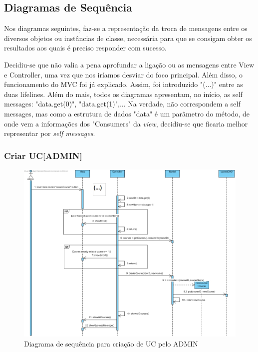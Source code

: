 \documentclass[a4paper]{article}
\begin{document}
\clearpage
\subsection{Diagramas de Sequência}

Nos diagramas seguintes, faz-se a representação da troca de mensagens entre os diversos objetos ou instâncias de classe, necessária para que se consigam obter os resultados aos quais é preciso responder com sucesso.

Decidiu-se que não valia a pena aprofundar a ligação ou as mensagens entre View e Controller, uma vez que nos iríamos desviar do foco principal. Além disso, o funcionamento do MVC foi já explicado. Assim, foi introduzido "(...)" entre as duas lifelines.
Além do mais, todos os diagramas apresentam, no início, as self messages: "data.get(0)", "data.get(1)",... 
Na verdade, não correspondem a self messages, mas como a estrutura de dados "data" é um parâmetro do método, de onde vem a informações dos "Consumers" da \emph{view}, decidiu-se que ficaria melhor representar por \emph{self messages}.


\subsubsection{Criar UC[ADMIN]}

\begin{figure}[H]
\centering
\includegraphics[width=14cm]{SEQcriarUC}
\caption{Diagrama de sequência para criação de UC pelo ADMIN}
\label{}
\end{figure}
\end{document}
